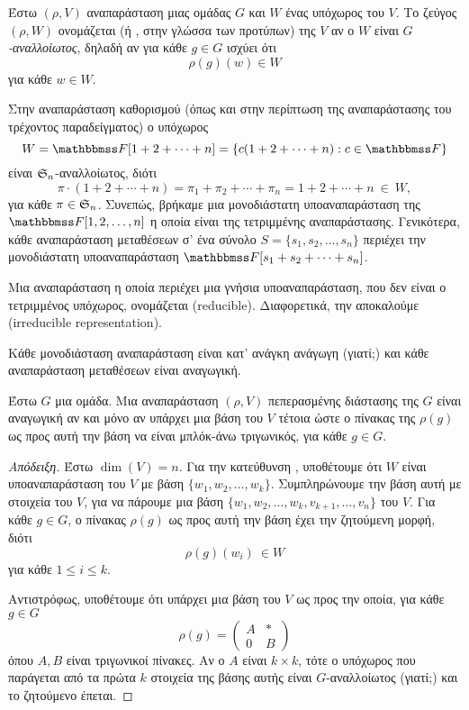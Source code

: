\documentclass[12pt,a4paper,reqno]{amsart}
\newcommand{\defn}[1]{{\color{mylightblue}{#1}}}
\begin{document}
\begin{definition}
    \label{def:subrepresentation}
    Έστω $(\rho, V)$ αναπαράσταση μιας ομάδας $G$ και $W$ ένας υπόχωρος του $V$. Το ζεύγος $(\rho,W)$ ονομάζεται \defn{υποαναπαράσταση} (ή \defn{$G$-υποπρότυπο}, στην γλώσσα των προτύπων) της $V$ αν ο $W$ είναι \emph{$G$-αναλλοίωτος}, δηλαδή αν για κάθε $g \in G$ ισχύει ότι 
    \[
    \rho(g)(w) \in W
    \]
    για κάθε $w \in W$.
\end{definition}

Στην αναπαράσταση καθορισμού (όπως και στην περίπτωση της αναπαράστασης του τρέχοντος παραδείγματος) ο υπόχωρος 
\[
W = \FF[1 + 2 + \cdots + n] = \{c(1+2+ \cdots + n) : c \in \FF\}
\]
είναι $\mathfrak{S}_n$-αναλλοίωτος, διότι
\[
\pi \cdot (1+2+\cdots+n) = \pi_1 + \pi_2 + \cdots + \pi_n = 1 + 2 + \cdots + n \ \in \ W,
\]
για κάθε $\pi \in \mathfrak{S}_n$. Συνεπώς, βρήκαμε μια μονοδιάστατη υποαναπαράσταση της $\FF[1,2,\dots,n]$ η οποία είναι  της τετριμμένης αναπαράστασης. Γενικότερα, κάθε αναπαράσταση μεταθέσεων σ' ένα σύνολο $S = \{s_1, s_2, \dots, s_n\}$ περιέχει την μονοδιάστατη υποαναπαράσταση $\FF[s_1 + s_2 + \cdots + s_n]$.

\begin{definition}
    \label{def:irreducible_representation}
    Μια αναπαράσταση η οποία περιέχει μια γνήσια υποαναπαράσταση, που δεν είναι ο τετριμμένος υπόχωρος, ονομάζεται \defn{αναγωγική} (reducible). Διαφορετικά, την αποκαλούμε \defn{ανάγωγη αναπαράσταση} (irreducible representation).
\end{definition}

Κάθε μονοδιάσταση αναπαράσταση είναι κατ' ανάγκη ανάγωγη (γιατί;) και κάθε αναπαράσταση μεταθέσεων είναι αναγωγική.

\begin{proposition}
    \label{prop:irreducible_representation_criterion}
    Έστω $G$ μια ομάδα. Μια αναπαράσταση $(\rho,V)$ πεπερασμένης διάστασης της $G$ είναι αναγωγική αν και μόνο αν υπάρχει μια βάση του $V$ τέτοια ώστε ο πίνακας της $\rho(g)$ ως προς αυτή την βάση να είναι μπλόκ-άνω τριγωνικός, για κάθε $g \in G$.
\end{proposition}

\begin{proof}[Απόδειξη]
Έστω $\dim(V) = n$. Για την κατεύθυνση \textquote{$\then$}, υποθέτουμε ότι $W$ είναι υποαναπαράσταση του $V$ με βάση $\{w_1, w_2, \dots, w_k\}$. Συμπληρώνουμε την βάση αυτή με στοιχεία του $V$, για να πάρουμε μια βάση $\{w_1, w_2, \dots, w_k, v_{k+1}, \dots, v_n\}$ του $V$. Για κάθε $g \in G$, ο πίνακας $\rho(g)$ ως προς αυτή την βάση έχει την ζητούμενη μορφή, διότι 
\[
\rho(g)(w_i) \ \in W
\]
για κάθε $1 \le i \le k$.

Αντιστρόφως, υποθέτουμε ότι υπάρχει μια βάση του $V$ ως προς την οποία, για κάθε $g \in G$
\[
\rho(g) = 
\begin{pmatrix}
    A & \ast \\ 
    0 & B
\end{pmatrix}
\]
όπου $A, B$ είναι τριγωνικοί πίνακες. Αν ο $A$ είναι $k\times{k}$, τότε ο υπόχωρος που παράγεται από τα πρώτα $k$ στοιχεία της βάσης αυτής είναι $G$-αναλλοίωτος (γιατί;) και το ζητούμενο έπεται.
\end{proof}
\end{document}
